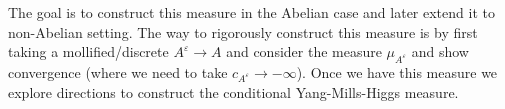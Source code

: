 \documentclass[12pt]{article}
\numberwithin{equation}{section}
\theoremstyle{definition}
\theoremstyle{remark}
\newcommand{\1}{\mathbf 1}
\newcommand{\<}{\langle}
\renewcommand{\>}{\rangle}
\newcommand{\orange}[1]{\textcolor{orange}{#1}}
\newcommand{\rmD}{\mathrm{D}}
\begin{document}
The goal is to construct this measure in the Abelian case and later extend it to non-Abelian setting. The way to rigorously construct this measure is by first taking a mollified/discrete $A^\varepsilon\to A$ and consider the measure $\mu_{A^\varepsilon}$ and show convergence (where we need to take $c_{A^\varepsilon}\to-\infty$). Once we have this measure we explore directions to construct the conditional Yang-Mills-Higgs measure.  





%
%

\end{document}
